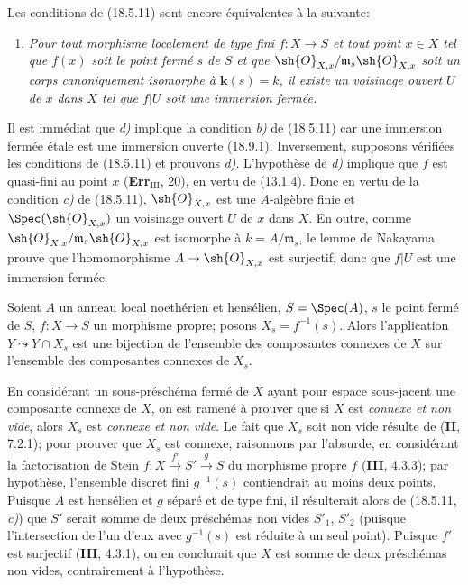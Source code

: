 \begin{remark}[18.5.18]
\label{IV.18.5.18}
Les conditions de (18.5.11) sont encore équivalentes à la suivante:
\begin{enumerate}
  \item[\textup{d)}] \itshape Pour tout morphisme localement de type fini $f:X\to S$ et tout point $x\in X$ tel que $f(x)$ soit le point fermé $s$ de $S$ et que $\sh{O}_{X,x}/\mathfrak m_s\sh{O}_{X,x}$ soit un corps canoniquement isomorphe à $\boldsymbol{k}(s)=k$, il existe un voisinage ouvert $U$ de $x$ dans $X$ tel que $f|U$ soit une immersion fermée.
\end{enumerate}
\end{remark}


Il est immédiat que \emph{d)} implique la condition \emph{b)} de (18.5.11) car une immersion fermée étale est une immersion ouverte (18.9.1). Inversement, supposons vérifiées les conditions de (18.5.11) et prouvons \emph{d)}. L'hypothèse de \emph{d)} implique que $f$ est quasi-fini au point $x$ (\textbf{Err}$_{\mathrm{III}}$, 20), en vertu de (13.1.4). Donc en vertu de la condition \emph{c)} de (18.5.11), $\sh{O}_{X,x}$ est une $A$-algèbre finie et $\Spec(\sh{O}_{X,x})$ un voisinage ouvert $U$ de $x$ dans $X$. En outre, comme $\sh{O}_{X,x}/\mathfrak m_s\sh{O}_{X,x}$ est isomorphe à $k=A/\mathfrak m_s$, le lemme de Nakayama prouve que l'homomorphisme $A\to\sh{O}_{X,x}$ est surjectif, donc que $f|U$ est une immersion fermée.

\begin{proposition}[18.5.19]
\label{IV.18.5.19}
Soient $A$ un anneau local noethérien et hensélien, $S=\Spec(A)$, $s$ le point fermé de $S$, $f:X\to S$ un morphisme propre; posons $X_s=f^{-1}(s)$. Alors l'application $Y\leadsto Y\cap X_s$ est une bijection de l'ensemble des composantes connexes de $X$ sur l'ensemble des composantes connexes de $X_s$.
\end{proposition}

En considérant un sous-préschéma fermé de $X$ ayant pour espace sous-jacent une composante connexe de $X$, on est ramené à prouver que si $X$ est \emph{connexe et non vide}, alors $X_s$ est \emph{connexe et non vide}. Le fait que $X_s$ soit non vide résulte de (\textbf{II}, 7.2.1); pour prouver que $X_s$ est connexe, raisonnons par l'absurde, en considérant la factorisation de Stein $f:X\xrightarrow{f'}S'\xrightarrow{g}S$ du morphisme propre $f$ (\textbf{III}, 4.3.3); par hypothèse, l'ensemble discret fini $g^{-1}(s)$ contiendrait au moins deux points. Puisque $A$ est hensélien et $g$ séparé et de type fini, il résulterait alors de (18.5.11, \emph{c)}) que $S'$ serait somme de deux préschémas non vides $S'_1$, $S'_2$ (puisque l'intersection de l'un d'eux avec $g^{-1}(s)$ est réduite à un seul point). Puisque $f'$ est surjectif (\textbf{III}, 4.3.1), on en conclurait que $X$ est somme de deux préschémas non vides, contrairement à l'hypothèse.

